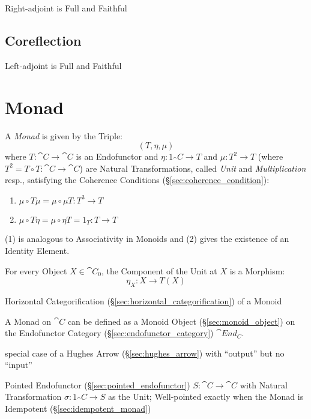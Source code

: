 Right-adjoint is Full and Faithful



\subsection{Coreflection}\label{sec:coreflection_adjunction}

\cite{winskel-nielsen93}

Left-adjoint is Full and Faithful



\section{Monad}\label{sec:monad}

A \emph{Monad} is given by the Triple:
\[
  (T, \eta, \mu)
\]
where $T : \cat{C} \rightarrow \cat{C}$ is an Endofunctor and $\eta :
1_\cat{C} \rightarrow T$ and $\mu : T^2 \rightarrow T$ (where $T^2 = T
\circ T : \cat{C} \rightarrow \cat{C}$) are Natural Transformations,
called \emph{Unit} and \emph{Multiplication} resp., satisfying the
Coherence Conditions (\S\ref{sec:coherence_condition}):
\begin{enumerate}
  \item $\mu \circ T\mu = \mu \circ \mu T : T^3 \rightarrow T$
  \item $\mu \circ T\eta = \mu \circ \eta T = 1_T : T \rightarrow T$
\end{enumerate}
(1) is analogous to Associativity in Monoids and (2) gives the
existence of an Identity Element.

For every Object $X \in \cat{C}_0$, the Component of the Unit at $X$
is a Morphism:
\[
  \eta_X : X \rightarrow T (X)
\]

Horizontal Categorification (\S\ref{sec:horizontal_categorification})
of a Monoid

A Monad on $\cat{C}$ can be defined as a Monoid Object
(\S\ref{sec:monoid_object}) on the Endofunctor Category
(\S\ref{sec:endofunctor_category}) $\cat{End_C}$.

special case of a Hughes Arrow (\S\ref{sec:hughes_arrow}) with
``output'' but no ``input''

Pointed Endofunctor (\S\ref{sec:pointed_endofunctor}) $S : \cat{C}
\rightarrow \cat{C}$ with Natural Transformation $\sigma : 1_\cat{C}
\rightarrow S$ as the Unit; Well-pointed exactly when the Monad is
Idempotent (\S\ref{sec:idempotent_monad})

